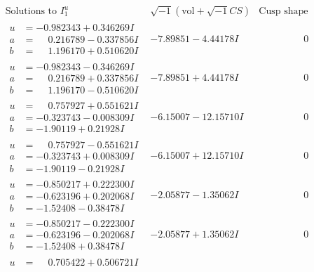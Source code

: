\documentclass[1p]{elsarticle_modified}
\theoremstyle{definition}
\newcommand{\I}{\sqrt{-1}}
\begin{document}
$$\begin{array}{c|c|c}  
\text{Solutions to }I^u_{1}& \I (\text{vol} + \sqrt{-1}CS) & \text{Cusp shape}\\
 \hline 
\begin{aligned}
u &= -0.982343 + 0.346269 I \\
a &= \phantom{-}0.216789 - 0.337856 I \\
b &= \phantom{-}1.196170 + 0.510620 I\end{aligned}
 & -7.89851 - 4.44178 I & \phantom{-0.000000 } 0 \\ \hline\begin{aligned}
u &= -0.982343 - 0.346269 I \\
a &= \phantom{-}0.216789 + 0.337856 I \\
b &= \phantom{-}1.196170 - 0.510620 I\end{aligned}
 & -7.89851 + 4.44178 I & \phantom{-0.000000 } 0 \\ \hline\begin{aligned}
u &= \phantom{-}0.757927 + 0.551621 I \\
a &= -0.323743 - 0.008309 I \\
b &= -1.90119 + 0.21928 I\end{aligned}
 & -6.15007 - 12.15710 I & \phantom{-0.000000 } 0 \\ \hline\begin{aligned}
u &= \phantom{-}0.757927 - 0.551621 I \\
a &= -0.323743 + 0.008309 I \\
b &= -1.90119 - 0.21928 I\end{aligned}
 & -6.15007 + 12.15710 I & \phantom{-0.000000 } 0 \\ \hline\begin{aligned}
u &= -0.850217 + 0.222300 I \\
a &= -0.623196 + 0.202068 I \\
b &= -1.52408 - 0.38478 I\end{aligned}
 & -2.05877 - 1.35062 I & \phantom{-0.000000 } 0 \\ \hline\begin{aligned}
u &= -0.850217 - 0.222300 I \\
a &= -0.623196 - 0.202068 I \\
b &= -1.52408 + 0.38478 I\end{aligned}
 & -2.05877 + 1.35062 I & \phantom{-0.000000 } 0 \\ \hline\begin{aligned}
u &= \phantom{-}0.705422 + 0.506721 I \\

\end{aligned}
\end{array}$$
\end{document}
